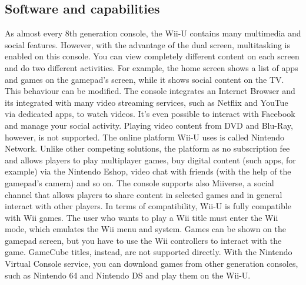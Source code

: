 \documentclass[a4paper,10pt]{book}
\begin{document}
 \subsection{ Software and capabilities  }
  As almost every 8th generation console, the Wii-U contains many multimedia and social features. However, with the advantage of the dual screen, multitasking is enabled on this console. You can view completely different content on each screen and do two different activities. For example, the home screen shows a list of apps and games on the gamepad's screen, while it shows social content on the TV. This behaviour can be modified.  
  The console integrates an Internet Browser and its integrated with many video streaming services, such as Netflix and YouTue via dedicated apps, to watch videos. It's even possible to interact with Facebook and manage your social activity. Playing video content from DVD and Blu-Ray, however, is not supported.  
  The online platform Wii-U uses is called Nintendo Network. Unlike other competing solutions, the platform as no subscription fee and allows players to play multiplayer games, buy digital content (such apps, for example) via the Nintendo Eshop, video chat with friends (with the help of the gamepad's camera) and so on.  
  The console supports also Miiverse, a social channel that allows players to share content in selected games and in general interact with other players.  
  In terms of compatibility, Wii-U is fully compatible with Wii games. The user who wants to play a Wii title must enter the Wii mode, which emulates the Wii menu and system. Games can be shown on the gamepad screen, but you have to use the Wii controllers to interact with the game. GameCube titles, instead, are not supported directly. With the Nintendo Virtual Console service, you can download games from other generation consoles, such as Nintendo 64 and Nintendo DS and play them on the Wii-U.  
\end{document}

